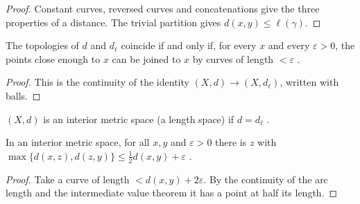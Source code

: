 \begin{proof}
  \leanok
  Constant curves, reversed curves and concatenations give the three properties of a distance.
  The trivial partition gives $d(x, y) \leq \ell(\gamma)$.
\end{proof}

\begin{lemma}
  \label{lem:ms-topologies}
  \leanok
  The topologies of $d$ and $d_\ell$ coincide if and only if, for every $x$ and every
  $\varepsilon > 0$, the points close enough to $x$ can be joined to $x$ by curves of length
  $< \varepsilon$ \cite[Lema~8.1.8]{Lar26}.
\end{lemma}

\begin{proof}
  \leanok
  This is the continuity of the identity $(X, d) \to (X, d_\ell)$, written with balls.
\end{proof}

\begin{definition}
  \label{def:ms-interior}
  \leanok
  $(X, d)$ is an interior metric space (a length space) if $d = d_\ell$
  \cite[\S8.1.1]{Lar26}.
\end{definition}

\begin{proposition}
  \label{prop:ms-midpoints}
  \leanok
  In an interior metric space, for all $x, y$ and $\varepsilon > 0$ there is $z$ with
  $\max\{d(x, z), d(z, y)\} \leq \frac12 d(x, y) + \varepsilon$ \cite[Problema~8.III]{Lar26}.
\end{proposition}

\begin{proof}
  \leanok
  Take a curve of length $< d(x, y) + 2\varepsilon$. By the continuity of the arc length and the
  intermediate value theorem it has a point at half its length.
\end{proof}

